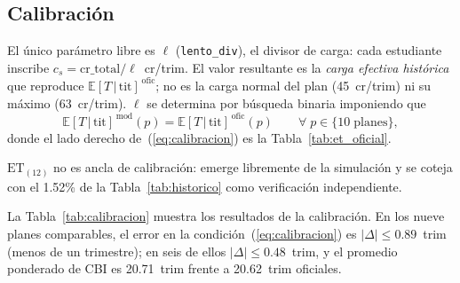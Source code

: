 \documentclass[11pt,letterpaper]{article}
\newcommand{\ET}[1]{\mathrm{ET}_{(#1)}}
\newcommand{\ETtit}{\mathbb{E}[T\,|\,\mathrm{tit}]}
\begin{document}
\subsection{Calibración}
\label{sec:calibracion}

El único parámetro libre es $\ell$ (\texttt{lento\_div}), el divisor de carga:
cada estudiante inscribe $c_s = \mathrm{cr\_total}/\ell$~cr/trim.
El valor resultante es la \emph{carga efectiva histórica} que reproduce
$\ETtit^{\,\mathrm{ofic}}$; no es la carga normal del plan (45~cr/trim) ni su máximo (63~cr/trim).
$\ell$ se determina por búsqueda binaria imponiendo que
\begin{equation}
  \ETtit^{\,\mathrm{mod}}(p) = \ETtit^{\,\mathrm{ofic}}(p)
  \qquad\forall\;p\in\{10\;\text{planes}\},
  \label{eq:calibracion}
\end{equation}
donde el lado derecho de~(\ref{eq:calibracion}) es la Tabla~\ref{tab:et_oficial}.

\begin{notabox}
$\ET{12}$ no es ancla de calibración: emerge libremente de la simulación y
se coteja con el 1.52\% de la Tabla~\ref{tab:historico} como verificación
independiente.
\end{notabox}

La Tabla~\ref{tab:calibracion} muestra los resultados de la calibración.
En los nueve planes comparables, el error en la condición~(\ref{eq:calibracion})
es $|\Delta|\leq 0.89$~trim (menos de un trimestre); en seis de ellos
$|\Delta|\leq 0.48$~trim, y el promedio
ponderado de CBI es 20.71~trim frente a 20.62~trim oficiales.
\end{document}
